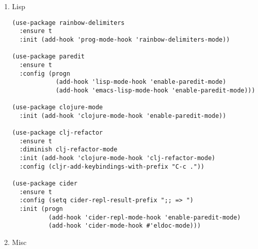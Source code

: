 \documentclass[11pt]{article}
\begin{document}
\begin{enumerate}
\begin{verbatim}
(use-package js2-mode
  :ensure t
  :mode "\\.js\\'"
  :init (progn
          (setq js2-highlight-level 3)
          (font-lock-add-keywords 'js2-mode
                                  `(("\\(function *\\)("
                                     (0 (progn
                                          (compose-region (match-beginning 1) (match-end 1) "\u0192")))))))
  :config (setq tab-width 4))                           ; cursive f symbol

(use-package js2-refactor
  :ensure t
  :config (progn
            (add-hook 'js2-mode-hook #'js2-refactor-mode)
            (js2r-add-keybindings-with-prefix "C-c r")))

(use-package flymake
  :ensure t)

(use-package flymake-perlcritic
  :ensure t
  ;:mode "\\.pl\\'"
  :init (setq flymake-perlcritic-severity 3))
\end{verbatim}

\item Lisp
\label{sec-1-2-2-3}

\begin{verbatim}
(use-package rainbow-delimiters
  :ensure t
  :init (add-hook 'prog-mode-hook 'rainbow-delimiters-mode))

(use-package paredit
  :ensure t 
  :config (progn
            (add-hook 'lisp-mode-hook 'enable-paredit-mode)
            (add-hook 'emacs-lisp-mode-hook 'enable-paredit-mode)))

(use-package clojure-mode
  :init (add-hook 'clojure-mode-hook 'enable-paredit-mode))

(use-package clj-refactor
  :ensure t
  :diminish clj-refactor-mode
  :init (add-hook 'clojure-mode-hook 'clj-refactor-mode)
  :config (cljr-add-keybindings-with-prefix "C-c ."))

(use-package cider
  :ensure t
  :config (setq cider-repl-result-prefix ";; => ")
  :init (progn
          (add-hook 'cider-repl-mode-hook 'enable-paredit-mode)
          (add-hook 'cider-mode-hook #'eldoc-mode)))
\end{verbatim}

\item Misc
\label{sec-1-2-2-4}


\end{enumerate}
\end{document}
